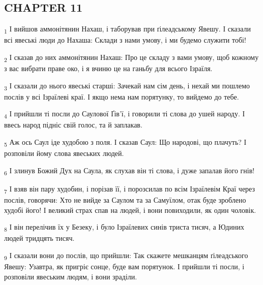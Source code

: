 \subsection{CHAPTER 11}
\begin{tcolorbox}
\textsubscript{1} І вийшов аммонітянин Нахаш, і таборував при ґілеадському Явешу. І сказали всі явеські люди до Нахаша: Склади з нами умову, і ми будемо служити тобі!
\end{tcolorbox}
\begin{tcolorbox}
\textsubscript{2} І сказав до них аммонітянин Нахаш: Про це складу з вами умову, щоб кожному з вас вибрати праве око, і я вчиню це на ганьбу для всього Ізраїля.
\end{tcolorbox}
\begin{tcolorbox}
\textsubscript{3} І сказали до нього явеські старші: Зачекай нам сім день, і нехай ми пошлемо послів у всі Ізраїлеві краї. І якщо нема нам порятунку, то вийдемо до тебе.
\end{tcolorbox}
\begin{tcolorbox}
\textsubscript{4} І прийшли ті посли до Саулової Ґів'ї, і говорили ті слова до ушей народу. І ввесь народ підніс свій голос, та й заплакав.
\end{tcolorbox}
\begin{tcolorbox}
\textsubscript{5} Аж ось Саул іде худобою з поля. І сказав Саул: Що народові, що плачуть? І розповіли йому слова явеських людей.
\end{tcolorbox}
\begin{tcolorbox}
\textsubscript{6} І злинув Божий Дух на Саула, як слухав він ті слова, і дуже запалав його гнів!
\end{tcolorbox}
\begin{tcolorbox}
\textsubscript{7} І взяв він пару худобин, і порізав її, і порозсилав по всім Ізраїлевім Краї через послів, говорячи: Хто не вийде за Саулом та за Самуїлом, отак буде зроблено худобі його! І великий страх спав на людей, і вони повиходили, як один чоловік.
\end{tcolorbox}
\begin{tcolorbox}
\textsubscript{8} І він перелічив їх у Безеку, і було Ізраїлевих синів триста тисяч, а Юдиних людей тридцять тисяч.
\end{tcolorbox}
\begin{tcolorbox}
\textsubscript{9} І сказали вони до послів, що прийшли: Так скажете мешканцям ґілеадського Явешу: Узавтра, як пригріє сонце, буде вам порятунок. І прийшли ті посли, і розповіли явеським людям, і вони зраділи.
\end{tcolorbox}
